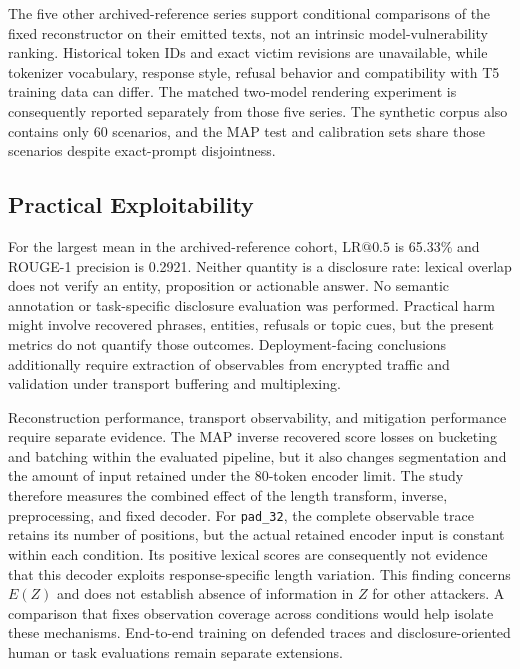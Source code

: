 \documentclass[electronics,article,submit,pdftex,moreauthors]{Definitions/mdpi}
\begin{document}
The five other archived-reference series support conditional comparisons of the fixed reconstructor on their emitted texts, not an intrinsic model-vulnerability ranking. Historical token IDs and exact victim revisions are unavailable, while tokenizer vocabulary, response style, refusal behavior and compatibility with T5 training data can differ. The matched two-model rendering experiment is consequently reported separately from those five series. The synthetic corpus also contains only 60 scenarios, and the MAP test and calibration sets share those scenarios despite exact-prompt disjointness.

\subsection{Practical Exploitability}
For the largest mean in the archived-reference cohort, $\mathrm{LR}@0.5$ is 65.33\% and ROUGE-1 precision is 0.2921. Neither quantity is a disclosure rate: lexical overlap does not verify an entity, proposition or actionable answer. No semantic annotation or task-specific disclosure evaluation was performed. Practical harm might involve recovered phrases, entities, refusals or topic cues, but the present metrics do not quantify those outcomes. Deployment-facing conclusions additionally require extraction of observables from encrypted traffic and validation under transport buffering and multiplexing.

Reconstruction performance, transport observability, and mitigation performance require separate evidence. The MAP inverse recovered score losses on bucketing and batching within the evaluated pipeline, but it also changes segmentation and the amount of input retained under the 80-token encoder limit. The study therefore measures the combined effect of the length transform, inverse, preprocessing, and fixed decoder. For \texttt{pad\_32}, the complete observable trace retains its number of positions, but the actual retained encoder input is constant within each condition. Its positive lexical scores are consequently not evidence that this decoder exploits response-specific length variation. This finding concerns $E(Z)$ and does not establish absence of information in $Z$ for other attackers. A comparison that fixes observation coverage across conditions would help isolate these mechanisms. End-to-end training on defended traces and disclosure-oriented human or task evaluations remain separate extensions.
\end{document}
